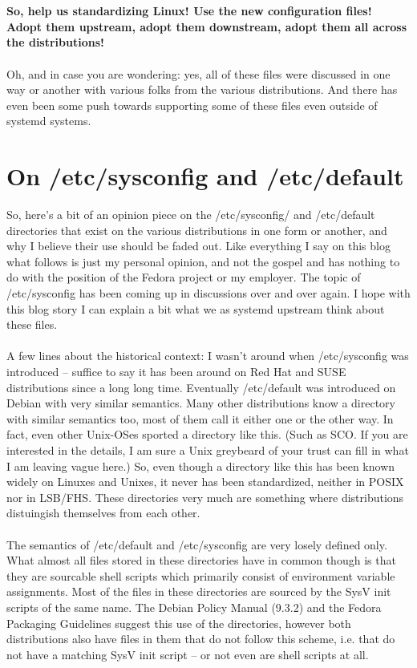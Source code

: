 \documentclass[titlepage]{article}
\begin{document}
\\
\\
\textbf{So, help us standardizing Linux! Use the new configuration files! Adopt them upstream, adopt them downstream, adopt them all across the distributions!}
\\
\\
Oh, and in case you are wondering: yes, all of these files were discussed in one way or another with various folks from the various distributions. And there has even been some push towards supporting some of these files even outside of systemd systems.
\section{On /etc/sysconfig and /etc/default}
So, here's a bit of an opinion piece on the /etc/sysconfig/ and /etc/default directories that exist on the various distributions in one form or another, and why I believe their use should be faded out. Like everything I say on this blog what follows is just my personal opinion, and not the gospel and has nothing to do with the position of the Fedora project or my employer. The topic of /etc/sysconfig has been coming up in discussions over and over again. I hope with this blog story I can explain a bit what we as systemd upstream think about these files.
\\
\\
A few lines about the historical context: I wasn't around when /etc/sysconfig was introduced -- suffice to say it has been around on Red Hat and SUSE distributions since a long long time. Eventually /etc/default was introduced on Debian with very similar semantics. Many other distributions know a directory with similar semantics too, most of them call it either one or the other way. In fact, even other Unix-OSes sported a directory like this. (Such as SCO. If you are interested in the details, I am sure a Unix greybeard of your trust can fill in what I am leaving vague here.) So, even though a directory like this has been known widely on Linuxes and Unixes, it never has been standardized, neither in POSIX nor in LSB/FHS. These directories very much are something where distributions distuingish themselves from each other.
\\
\\
The semantics of /etc/default and /etc/sysconfig are very losely defined only. What almost all files stored in these directories have in common though is that they are sourcable shell scripts which primarily consist of environment variable assignments. Most of the files in these directories are sourced by the SysV init scripts of the same name. The Debian Policy Manual (9.3.2) and the Fedora Packaging Guidelines suggest this use of the directories, however both distributions also have files in them that do not follow this scheme, i.e. that do not have a matching SysV init script -- or not even are shell scripts at all.
\end{document}
